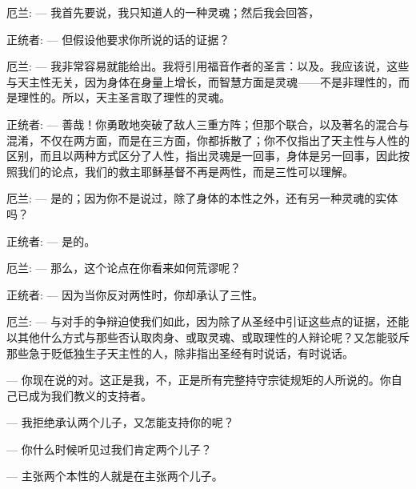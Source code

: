 厄兰: — 我首先要说，我只知道人的一种灵魂；然后我会回答，\par

正统者: — 但假设他要求你所说的话的证据？\par

厄兰: — 我非常容易就能给出。我将引用福音作者的圣言：以及。我应该说，这些与天主性无关，因为身体在身量上增长，而智慧方面是灵魂——不是非理性的，而是理性的。所以，天主圣言取了理性的灵魂。\par

正统者: — 善哉！你勇敢地突破了敌人三重方阵；但那个联合，以及著名的混合与混淆，不仅在两方面，而是在三方面，你都拆散了；你不仅指出了天主性与人性的区别，而且以两种方式区分了人性，指出灵魂是一回事，身体是另一回事，因此按照我们的论点，我们的救主耶稣基督不再是两性，而是三性可以理解。\par

厄兰: — 是的；因为你不是说过，除了身体的本性之外，还有另一种灵魂的实体吗？\par

正统者: — 是的。\par

厄兰: — 那么，这个论点在你看来如何荒谬呢？\par

正统者: — 因为当你反对两性时，你却承认了三性。\par

厄兰: — 与对手的争辩迫使我们如此，因为除了从圣经中引证这些点的证据，还能以其他什么方式与那些否认取肉身、或取灵魂、或取理性的人辩论呢？又怎能驳斥那些急于贬低独生子天主性的人，除非指出圣经有时说话，有时说话。\par

— 你现在说的对。这正是我，不，正是所有完整持守宗徒规矩的人所说的。你自己已成为我们教义的支持者。\par

— 我拒绝承认两个儿子，又怎能支持你的呢？\par

— 你什么时候听见过我们肯定两个儿子？\par

— 主张两个本性的人就是在主张两个儿子。\par

